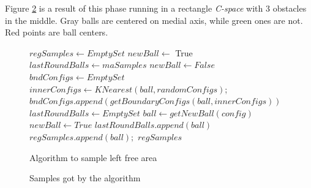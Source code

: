 \documentclass[11pt]{article}
\begin{document}
\indent Figure \ref{Samples} is a result of this phase running in a rectangle \emph{C-space} with 3 obstacles in the middle. Gray balls are centered on medial axis, while green ones are not. Red points are ball centers.

\begin{figure}
\begin{algorithmic}[1] 
  	\State $regSamples \gets EmptySet$ 
  	\State $newBall \gets$ True	
  	\State $lastRoundBalls \gets maSamples$
  		\State $newBall \gets False$
		\State $bndConfigs \gets EmptySet$   		
  			\State $innerConfigs \gets KNearest(ball, randomConfigs)$; 
  			\State $bndConfigs.append( getBoundaryConfigs(ball, innerConfigs) )$
  		\EndFor
  		\State $lastRoundBalls \gets EmptySet$
  			 
  				\State $ball \gets getNewBall(config)$ 
  					\State $newBall \gets True$
  					\State $lastRoundBalls.append( ball )$
  					\State $regSamples.append(ball);$
  				\EndIf
  			\EndIf
  		\EndFor
  	\EndWhile
  	\State \Return $regSamples$
  \EndFunction
  \end{algorithmic}
  \caption{\label{SampleLeftArea} Algorithm to sample left free area}
\end{figure}

\begin{figure}
	\caption{\label{Samples} Samples got by the algorithm}
\end{figure}
\end{document}
